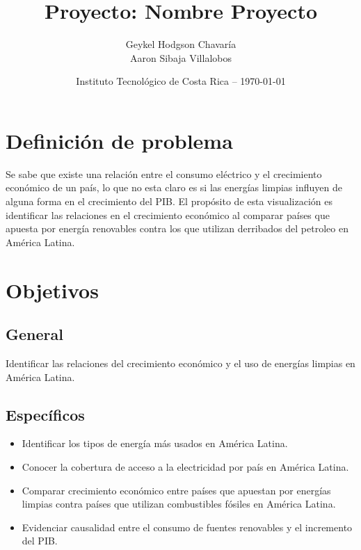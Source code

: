 \documentclass{article}
\title{Proyecto: Nombre Proyecto} %
\author{Geykel Hodgson Chavaría\\ 
Aaron Sibaja Villalobos  
} %
\date{Instituto  Tecnológico de Costa Rica -- \today} %
\begin{document}
\maketitle %


\section{Definición de problema}
Se sabe que existe una relación entre el consumo eléctrico y el crecimiento económico de un país, lo que no esta claro es si las energías limpias influyen de alguna forma en el crecimiento del PIB. El propósito de esta visualización es identificar las relaciones en el crecimiento económico al comparar países que apuesta por energía renovables contra los que utilizan derribados del petroleo en América Latina.

\section{Objetivos}
\subsection{General}
Identificar las relaciones del crecimiento económico y el uso de energías limpias en América Latina.
\subsection{Específicos }
\begin{itemize}
    \item Identificar los tipos de energía más usados en América Latina.
    \item Conocer la cobertura de acceso a la electricidad por país en América Latina.
    \item Comparar crecimiento económico entre países que apuestan por energías limpias contra países que utilizan combustibles fósiles en América Latina.
    \item Evidenciar causalidad entre el consumo de fuentes renovables y el incremento del PIB.
\end{itemize}
\end{document}
